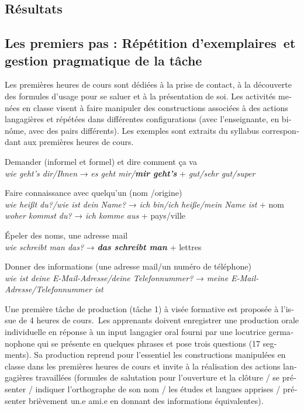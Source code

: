 \documentclass[output=paper]{langscibook}
\begin{document}
\begin{otherlanguage}{french}
\section{Résultats}
\subsection{Les premiers pas : Répétition d’exemplaires~et gestion pragmatique de la tâche}
\largerpage

Les premières heures de cours sont dédiées à la prise de contact, à la découverte des formules d’usage pour se saluer et à la présentation de soi. Les activités menées en classe visent à faire manipuler des constructions associées à des actions langagières et répétées dans différentes configurations (avec l’enseignante, en binôme, avec des pairs différents). Les exemples  sont extraits du syllabus correspondant aux premières heures de cours.


\ea\label{tab:felce:6}
\ea Demander  (informel et formel) et dire comment ça va\\
\textit{wie geht’s dir/Ihnen}   → \textit{es geht mir/\textbf{mir geht’s}} + \textit{gut/sehr gut/super}

\ex Faire connaissance avec quelqu’un (nom /origine)\\
\ea \textit{wie heißt du?/wie ist dein Name?} → \textit{ich bin/ich heiße/mein Name ist} + nom
\ex \textit{woher kommst du?} → \textit{ich komme aus} + pays/ville
\z

\ex Épeler des noms, une adresse mail\\
\textit{wie schreibt man das?} → \textbf{\textit{das schreibt man}} + lettres

\ex Donner des informations (une adresse mail/un numéro de téléphone)\\
\textit{wie ist deine E-Mail-Adresse/deine Telefonnummer?} → \textit{meine  E-Mail-Adresse/Telefonnummer  ist}
\z
\z


  
 

Une première tâche de production (tâche 1) à visée formative est proposée à l’issue de 4 heures de cours.~Les apprenants doivent enregistrer une production orale individuelle en réponse à un input langagier oral fourni par une locutrice germanophone qui se présente en quelques phrases et pose trois questions (17 segments). Sa production reprend pour l’essentiel les constructions manipulées en classe dans les premières heures de cours et invite à la réalisation des actions langagières travaillées (formules de salutation pour l’ouverture et la clôture / se présenter / indiquer l’orthographe de son nom / les études et langues apprises / présenter brièvement un.e ami.e  en donnant des informations équivalentes).


\end{otherlanguage}
\end{document}
